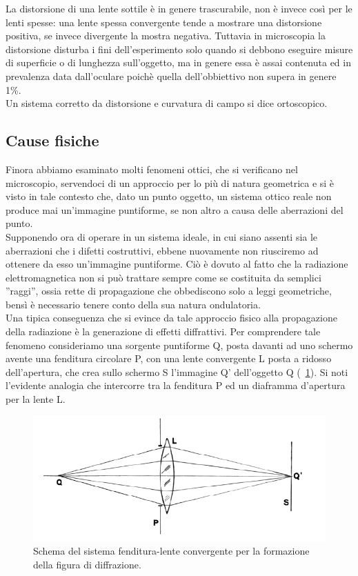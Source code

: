 \begin{itemize}
La distorsione di una lente sottile è in genere trascurabile, non è invece così per le lenti spesse: una lente spessa convergente tende a mostrare una distorsione positiva, se invece divergente la mostra negativa.
Tuttavia in microscopia la distorsione disturba i fini dell'esperimento solo quando si debbono eseguire misure di superficie o di lunghezza sull'oggetto, ma in genere essa è assai contenuta ed in prevalenza data dall'oculare poichè quella dell'obbiettivo non supera in genere 1\%.\\
Un sistema corretto da distorsione e curvatura di campo si dice ortoscopico.

\end{itemize}

\subsection {Cause fisiche}

Finora abbiamo esaminato molti fenomeni ottici, che si verificano nel microscopio, servendoci di un approccio per lo più di natura geometrica e si è visto in tale contesto che, dato un punto oggetto, un sistema ottico reale non produce mai un'immagine puntiforme, se non altro a causa delle aberrazioni del punto.\\
Supponendo ora di operare in un sistema ideale, in cui siano assenti sia le aberrazioni che i difetti costruttivi, ebbene nuovamente non riusciremo ad ottenere da esso un'immagine puntiforme. Ciò è dovuto al fatto che la radiazione elettromagnetica non si può trattare sempre come se costituita da semplici ''raggi'', ossia rette di propagazione che obbediscono solo a leggi geometriche, bensì è necessario tenere conto della sua natura ondulatoria.  \\
Una tipica conseguenza che si evince da tale approccio fisico alla propagazione della radiazione è la generazione di effetti diffrattivi.
Per comprendere tale fenomeno consideriamo una sorgente puntiforme Q, posta davanti ad uno schermo avente una fenditura circolare P, con una lente convergente L posta a ridosso dell'apertura, che crea sullo schermo S l'immagine Q' dell'oggetto Q (\figurename~\ref{fig:diff}). Si noti l'evidente analogia che intercorre tra la fenditura P ed un diaframma d'apertura per la lente L.

\begin{figure}[!ht]
 \centering
 \includegraphics[scale=.50]{img/CAP2diff.png}
 \caption{\small{Schema del sistema fenditura-lente convergente per la formazione della figura di diffrazione.}}
 \label{fig:diff}
\end{figure}

